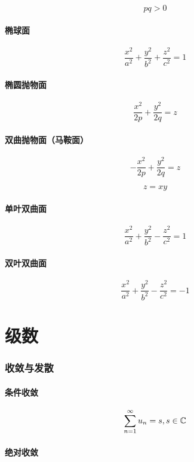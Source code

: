 \documentclass{article}
\begin{document}
\begin{definition}[以下二次曲面方程中都有]
    \[pq>0\]
\end{definition}

\subsection{椭球面}

\[\frac{x^2}{a^2}+\frac{y^2}{b^2}+\frac{z^2}{c^2}=1\]

\subsection{椭圆抛物面}

\[\frac{x^2}{2p}+\frac{y^2}{2q}=z\]

\subsection{双曲抛物面（马鞍面）}

\[-\frac{x^2}{2p}+\frac{y^2}{2q}=z\]

\[z=xy\]

\subsection{单叶双曲面}

\[\frac{x^2}{a^2}+\frac{y^2}{b^2}-\frac{z^2}{c^2}=1\]

\subsection{双叶双曲面}

\[\frac{x^2}{a^2}+\frac{y^2}{b^2}-\frac{z^2}{c^2}=-1\]

\part{级数}

\section{收敛与发散}

\subsection{条件收敛}

\[\sum_{n=1}^\infty u_n=s,s\in\sc\]

\subsection{绝对收敛}
\end{document}
